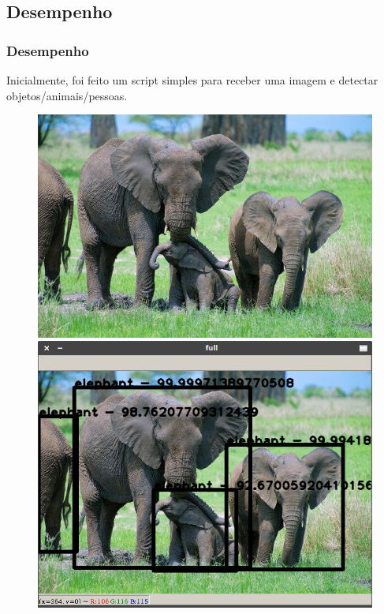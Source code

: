 \documentclass{beamer}
\begin{document}
	
	
	\subsection{Desempenho}
	
	\begin{frame}
	\frametitle{Desempenho}
			
		Inicialmente, foi feito um script simples para receber uma imagem e detectar objetos/animais/pessoas.
		
		
		\begin{figure}
			\includegraphics[scale=0.25]{../media/Elephant}
			\hspace{0.6cm}
			\includegraphics[scale=0.25]{Imgs/elefantes_classificados}
		\end{figure}
	\end{frame}
	
\end{document}
